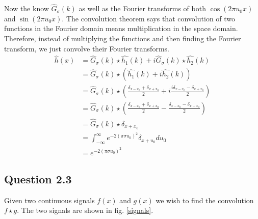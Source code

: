 \documentclass[a4paper, 10pt, final]{article}
\begin{document}
Now the know $\hat{G}_{\sigma}(k)$ as well as the Fourier transforms of
both $\cos(2\pi u_0 x)$ and $\sin(2\pi u_0 x)$. The convolution theorem
says that convolution of two functions in the Fourier domain means
multiplication in the space domain. Therefore, instead of multiplying
the functions and then finding the Fourier transform, we just convolve
their Fourier transforms.
\begin{align}
    \hat{h}(x) & = \hat{G}_{\sigma}(k) \star \hat{h_1}(k) + i\hat{G}_{\sigma}(k) \star \hat{h_2}(k)\\
     & = \hat{G}_{\sigma}(k) \star (\hat{h_1}(k) + i\hat{h_2}(k))\\
     & = \hat{G}_{\sigma}(k) \star \left(\frac{\delta_{x - x_0} + \delta_{x + x_0}}{2} + i\frac{i\delta_{x - x_0} - \delta_{x + x_0}}{2}\right)\\
     & = \hat{G}_{\sigma}(k) \star \left(\frac{\delta_{x - x_0} + \delta_{x + x_0}}{2} - \frac{\delta_{x - x_0} - \delta_{x + x_0}}{2}\right)\\
     & = \hat{G}_{\sigma}(k) \star \delta_{x + x_0}\\
     & = \int_{-\infty}^{\infty}{e^{-2(\pi\sigma u_0)^2}\delta_{x + u_0}du_0}\\
     & = e^{-2(\pi\sigma u_0)^2}
\end{align}

\subsection*{Question 2.3}
Given two continuous signals $f(x)$ and $g(x)$ we wish to find the
convolution $f \star g$. The two signals are shown in fig.
\ref{signals}.
\end{document}
